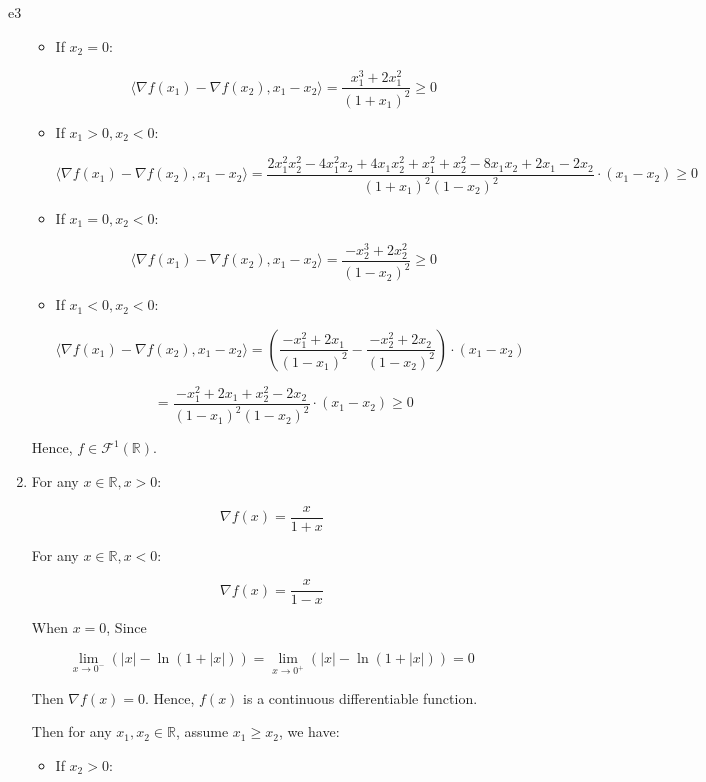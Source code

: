 \documentclass{article}
\begin{document}
\begin{PROOF}{e3}
\begin{enumerate}
\begin{itemize}
		\item If \(x_{2} = 0\):
	
		\[
		\langle \nabla f\left(x_{1}\right) - \nabla f\left(x_{2}\right), x_{1} - x_{2} \rangle = \frac{x_{1}^{3} + 2x_{1}^{2}}{\left(1 + x_{1}\right)^{2}} \geq 0
		\]
	
		\item If \(x_{1} > 0, x_{2} < 0\):
	
		\[
		\langle \nabla f\left(x_{1}\right) - \nabla f\left(x_{2}\right), x_{1} - x_{2} \rangle = \frac{2x_{1}^{2}x_{2}^{2} - 4x_{1}^{2}x_{2} + 4x_{1}x_{2}^{2} + x_{1}^{2} + x_{2}^{2} - 8x_{1}x_{2} + 2x_{1} - 2x_{2}}{\left(1 + x_{1}\right)^{2}(1 - x_{2})^{2}} \cdot \left(x_{1} - x_{2}\right) \geq 0
		\]
		
		\item If \(x_{1} = 0, x_{2} < 0\):
		
		\[
		\langle \nabla f\left(x_{1}\right) - \nabla f\left(x_{2}\right), x_{1} - x_{2} \rangle = \frac{-x_{2}^{3} + 2x_{2}^{2}}{\left(1 - x_{2}\right)^{2}} \geq 0
		\]
		
		\item If \(x_{1} < 0, x_{2} < 0\):
		
		\[
		\langle \nabla f\left(x_{1}\right) - \nabla f\left(x_{2}\right), x_{1} - x_{2} \rangle = \left(\frac{-x_{1}^{2} + 2x_{1}}{\left(1 - x_{1}\right)^{2}} - \frac{-x_{2}^{2} + 2x_{2}}{\left(1 - x_{2}\right)^{2}}\right) \cdot \left(x_{1} - x_{2}\right)
		\]
		
		\[
		= \frac{-x_{1}^{2} + 2x_{1} + x_{2}^{2} - 2x_{2}}{\left(1 - x_{1}\right)^{2} \left(1 - x_{2}\right)^{2}} \cdot \left(x_{1} - x_{2}\right) \geq 0
		\]
	\end{itemize}
	Hence, \(f \in \mathcal{F}^{1}(\mathbb{R})\).
	\item For any \(x\in\mathbb{R}, x > 0\):

	\[
	\nabla f(x) = \frac{x}{1 + x}
	\]
	
	For any \(x\in\mathbb{R}, x < 0\):
	
	\[
	\nabla f(x) = \frac{x}{1 - x}
	\]
	
	When \(x = 0\), Since
	
	\[
	\lim_{x \to 0^{-}} \left( |x| - \ln(1 + |x|) \right) = \lim_{x \to 0^{+}} \left( |x| - \ln(1 + |x|) \right) = 0
	\]
	
	Then $\nabla f(x) = 0$. Hence, $f(x)$ is a continuous differentiable function.
	
	Then for any \(x_1, x_2 \in \mathbb{R}\), assume \(x_1 \geq x_2\), we have:
	\begin{itemize}
		\item If \(x_2 > 0\):
	

\end{itemize}
\end{enumerate}
\end{PROOF}
\end{document}
